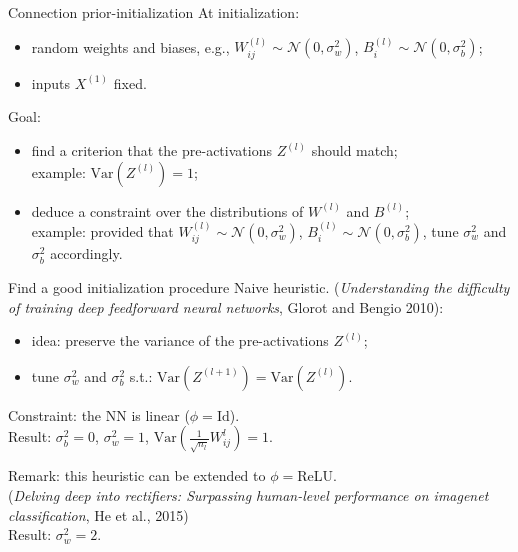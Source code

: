 \documentclass[9pt,handout]{beamer}
\begin{document}
\begin{frame}{Connection prior-initialization}
	\alert{At initialization:}
	\begin{itemize}
		\item random weights and biases, e.g., $W^{(l)}_{ij} \sim \mathcal{N}(0, \sigma_w^2)$, 
		$B^{(l)}_{i} \sim \mathcal{N}(0, \sigma_b^2)$;
		\item inputs $X^{(1)}$ fixed.
	\end{itemize} 

	\bigskip
	
	\alert{Goal:}
	\begin{itemize}
		\item find a criterion that the pre-activations $Z^{(l)}$ should match;  \\
			example: $\mathrm{Var}(Z^{(l)}) = 1$;  
		\item deduce a constraint over the distributions of $W^{(l)}$ and $B^{(l)}$;  \\
			example: provided that $W^{(l)}_{ij} \sim \mathcal{N}(0, \sigma_w^2)$, 
			$B^{(l)}_{i} \sim \mathcal{N}(0, \sigma_b^2)$, tune $\sigma_w^2$ and $\sigma_b^2$ accordingly.
	\end{itemize} 
\end{frame}


\begin{frame}{Find a good initialization procedure}
	\alert{Naive heuristic.} (\emph{Understanding the difficulty of training deep feedforward neural 
	networks}, Glorot and Bengio 2010):
	\begin{itemize}
		\item idea: preserve the variance of the pre-activations $Z^{(l)}$;
		\item tune $\sigma_w^2$ and $\sigma_b^2$ s.t.: $\mathrm{Var}(Z^{(l + 1)}) = 
		\mathrm{Var}(Z^{(l)})$. 
	\end{itemize}
	Constraint: the NN is linear ($\phi = \mathrm{Id}$).  \\
	Result: $\sigma_b^2 = 0$, $\sigma_w^2 = 1$, $\mathrm{Var}(\frac{1}{\sqrt{n_l}} W_{ij}^l) = 1$.

	
	\bigskip
	
	\alert{Remark:} this heuristic can be extended to $\phi = $ReLU. \\
	(\emph{Delving deep into rectifiers: Surpassing human-level performance on imagenet classification}, He et al.,  
	2015)  \\
	Result: $\sigma_w^2 = 2$.
\end{frame}
\end{document}
